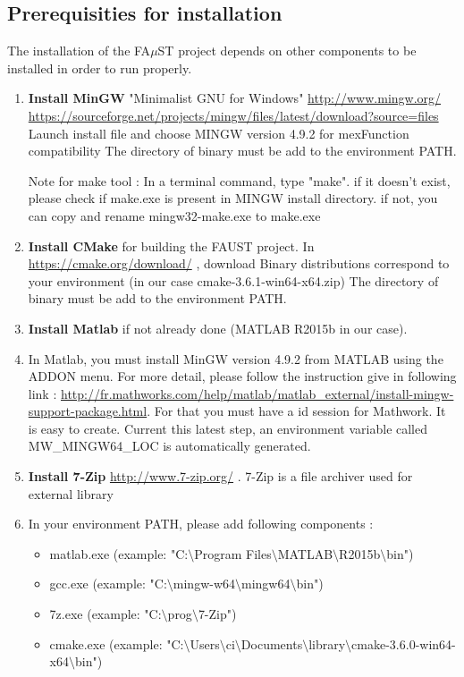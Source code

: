 \subsection{Prerequisities for installation}\label{sec:WinPrerequisitiesInstall}
The installation of the FA$\mu$ST project depends on other components to be installed in order to run properly. 
\begin{enumerate}
\item \textbf{Install MinGW} "Minimalist GNU for Windows" \url{http://www.mingw.org/}
\url{https://sourceforge.net/projects/mingw/files/latest/download?source=files}
Launch install file and choose MINGW version 4.9.2 for mexFunction compatibility 
The directory of binary must be add to the environment PATH. 

Note for make tool : In a terminal command, type "make". if it doesn't exist, please check if make.exe is present in MINGW install directory.
if not, you can copy and rename mingw32-make.exe to make.exe


\item \textbf{Install CMake} for building the FAUST project. 
In \url{https://cmake.org/download/} , download Binary distributions correspond to your environment (in our case  cmake-3.6.1-win64-x64.zip)
The directory of binary must be add to the environment PATH. 

\item \textbf{Install Matlab} if not already done (MATLAB R2015b in our case).

\item In Matlab, you must install MinGW version 4.9.2 from MATLAB using the ADDON menu. For more detail, please follow the instruction give in following link :  
\url{http://fr.mathworks.com/help/matlab/matlab_external/install-mingw-support-package.html}. For that you must have a id session for Mathwork. It is easy to create. 
Current this latest step, an environment variable called MW\_MINGW64\_LOC is automatically generated. 

\item \textbf{Install 7-Zip} \url{http://www.7-zip.org/} . 7-Zip is a file archiver used for external library

\item In your environment PATH, please add following components :

\begin{itemize}
\item matlab.exe (example: "C:$\setminus$Program Files$\setminus$MATLAB$\setminus$R2015b$\setminus$bin")
\item gcc.exe (example: "C:$\setminus$mingw-w64$\setminus$mingw64$\setminus$bin") 
\item 7z.exe (example: "C:$\setminus$prog$\setminus$7-Zip")
\item cmake.exe (example: "C:$\setminus$Users$\setminus$ci$\setminus$Documents$\setminus$library$\setminus$cmake-3.6.0-win64-x64$\setminus$bin")
\end{itemize}
\end{enumerate}


